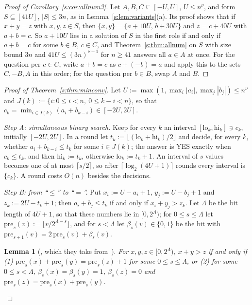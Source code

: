 \documentclass[11pt]{article}
\newtheorem{lemma}[theorem]{Lemma}
\theoremstyle{definition}
\theoremstyle{remark}
\begin{document}
\begin{proof}[Proof of Corollary~\ref{s:cor:allnum3}]
Let $A,B,C\subseteq[-U,U]$, $U\le n^\nu$, and form $S\subseteq[41U]$, $|S|\le3n$, as in Lemma~\ref{s:lem:variants}(a). Its proof shows that if $x+y=z$ with $x,y,z\in S$, then $\{x,y\}=\{a+10U,\,b+30U\}$ and $z=c+40U$ with $a+b=c$. So $a+10U$ lies in a solution of $S$ in the first role if and only if $a+b=c$ for some $b\in B$, $c\in C$, and Theorem~\ref{s:thm:allnum} on $S$ with size bound $3n$ and $41U\le(3n)^{\nu+1}$ for $n\ge41$ answers all $a\in A$ at once. For the question per $c\in C$, write $a+b=c$ as $c+(-b)=a$ and apply this to the sets $C,-B,A$ in this order; for the question per $b\in B$, swap $A$ and $B$.
\end{proof}

\begin{proof}[Proof of Theorem~\ref{s:thm:minconv}]
Let $U:=\max(1,\max_i|a_i|,\max_j|b_j|)\le n^\nu$ and $J(k):=\{i:0\le i<n,\ 0\le k-i<n\}$, so that $c_k=\min_{i\in J(k)}(a_i+b_{k-i})\in[-2U,2U]$.

\emph{Step A: simultaneous binary search.} Keep for every $k$ an interval $[\mathrm{lo}_k,\mathrm{hi}_k]\ni c_k$, initially $[-2U,2U]$. In a round let $t_k:=\lfloor(\mathrm{lo}_k+\mathrm{hi}_k)/2\rfloor$ and decide, for every $k$, whether $a_i+b_{k-i}\le t_k$ for some $i\in J(k)$; the answer is YES exactly when $c_k\le t_k$, and then $\mathrm{hi}_k:=t_k$, otherwise $\mathrm{lo}_k:=t_k+1$. An interval of $s$ values becomes one of at most $\lceil s/2\rceil$, so after $\lceil\log_2(4U+1)\rceil$ rounds every interval is $\{c_k\}$. A round costs $O(n)$ besides the decisions.

\emph{Step B: from ``$\le$'' to ``$=$''.} Put $x_i:=U-a_i+1$, $y_j:=U-b_j+1$ and $z_k:=2U-t_k+1$; then $a_i+b_j\le t_k$ if and only if $x_i+y_j>z_k$. Let $\Lambda$ be the bit length of $4U+1$, so that these numbers lie in $[0,2^\Lambda)$; for $0\le s\le\Lambda$ let $\mathrm{pre}_s(v):=\lfloor v/2^{\Lambda-s}\rfloor$, and for $s<\Lambda$ let $\beta_s(v)\in\{0,1\}$ be the bit with $\mathrm{pre}_{s+1}(v)=2\,\mathrm{pre}_s(v)+\beta_s(v)$.

\begin{lemma}[{\cite[Lemma~26]{CMWW19}, which they take from~\cite{VW13}}]\label{b:lem:prefix}
For $x,y,z\in[0,2^\Lambda)$, $x+y>z$ if and only if (1) $\mathrm{pre}_s(x)+\mathrm{pre}_s(y)=\mathrm{pre}_s(z)+1$ for some $0\le s\le\Lambda$, or (2) for some $0\le s<\Lambda$, $\beta_s(x)=\beta_s(y)=1$, $\beta_s(z)=0$ and $\mathrm{pre}_s(z)=\mathrm{pre}_s(x)+\mathrm{pre}_s(y)$.
\end{lemma}


\end{proof}
\end{document}
